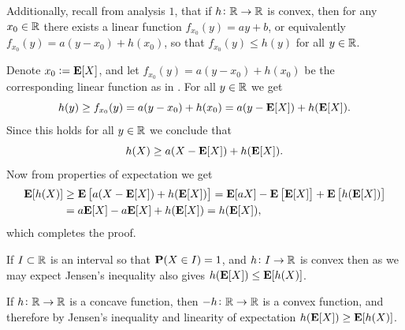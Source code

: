 \documentclass[11pt,a4paper]{article}
\begin{document}
\begin{remark}
  \label{rmk:convex-function-property}
  Additionally, recall from analysis $1$,
  that if $h \colon \mathbb{R} \to \mathbb{R}$ is convex,
  then for any $x_0 \in \mathbb{R}$ there exists a linear function
  $f_{x_0}(y) = ay + b$,
  or equivalently $f_{x_0}(y) = a(y - x_0) + h(x_0)$,
  so that $f_{x_0}(y) \le h(y)$ for all $y \in \mathbb{R}$.
\end{remark}

\begin{proofof}{}
  Denote $x_0 := \mathbf{E}[X]$,
  and let $f_{x_0}(y) = a(y - x_0) + h(x_0)$
  be the corresponding linear function
  as in .
  For all $y \in \mathbb{R}$ we get
  \[
    h(y) \geq f_{x_0}(y) =
    a(y - x_0) + h(x_0) =
    a(y - \mathbf{E}[X]) + h(\mathbf{E}[X]).
  \]
  Since this holds for all $y \in \mathbb{R}$ we conclude that
  \[
    h(X) \geq a(X - \mathbf{E}[X]) + h(\mathbf{E}[X]).
  \]
  Now from properties of expectation we get
  \begin{align*}
    \mathbf{E}[h(X)] &\geq
    \mathbf{E}\left[a(X - \mathbf{E}[X]) + h(\mathbf{E}[X])\right] =
    \mathbf{E}[aX] - \mathbf{E}\left[\mathbf{E}[X]\right] + \mathbf{E}\left[h(\mathbf{E}[X])\right] \\ &=
    a \mathbf{E}[X] - a\mathbf{E}[X] + h(\mathbf{E}[X]) =
    h(\mathbf{E}[X]),
  \end{align*}
  which completes the proof.
\end{proofof}

\begin{remark}
  If $I \subset \mathbb{R}$ is an interval so that $\mathbf{P}(X \in I) = 1$,
  and $h \colon I \to \mathbb{R}$ is convex then as we may expect
  Jensen's inequality also gives $h(\mathbf{E}[X]) \le \mathbf{E}[h(X)]$.
\end{remark}

\begin{remark}
  If $h \colon \mathbb{R} \to \mathbb{R}$ is a concave function,
  then $-h \colon \mathbb{R} \to \mathbb{R}$ is a convex function,
  and therefore by Jensen's inequality and linearity of expectation
  $h(\mathbf{E}[X]) \geq \mathbf{E}[h(X)]$.
\end{remark}
\end{document}
